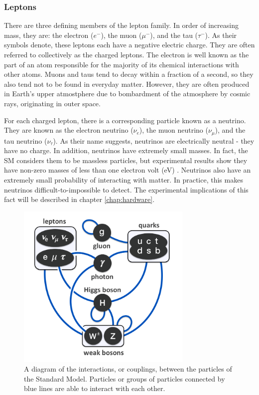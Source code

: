 \subsubsection*{Leptons}
There are three defining members of the lepton family. In order of
increasing mass, they are: the electron
($e^-$), the muon ($\mu^-$), and the tau ($\tau^-$). As their symbols
denote, these leptons each have a negative electric charge. They are
often referred to collectively as the charged leptons.
The electron is well known as the part of an atom responsible for the
majority of its chemical interactions with other atoms. Muons and taus
tend to decay within a fraction of a second, so they also tend not to
be found in everyday matter. However, they are often produced in
Earth's upper atmostphere due to bombardment of the atmosphere by
cosmic rays, originating in outer space.

For each charged lepton, there is a corresponding particle known as a
neutrino. They are known as the electron neutrino ($\nu_e$), the muon
neutrino ($\nu_{\mu}$), and the tau neutrino ($\nu_{\tau}$). As their
name suggests, neutrinos are electrically neutral - they have no
charge. In addition, neutrinos have extremely small masses. In fact,
the SM considers them to be massless particles, but experimental
results show they have non-zero masses of less than one electron volt
(eV) \cite{pdg}. Neutrinos also have an extremely small probability of
interacting with matter. In practice, this makes neutrinos
difficult-to-impossible to detect. The experimental implications of
this fact will be described in chapter \ref{chap:hardware}.

\begin{figure}[h]
  \centering
  \includegraphics[width=0.75\textwidth]{figures/couplings.png}
  \caption{A diagram of the interactions, or couplings,
    between the particles of the Standard Model. Particles or groups
    of particles connected by blue lines are able to interact with
    each other.}
  \label{fig:couplings}
\end{figure}

